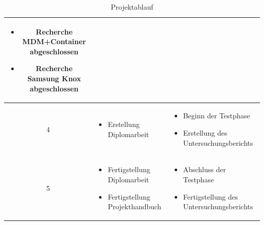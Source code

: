 \begin{table}
\begin{tabular}{| c | p{6cm} | p{7cm} |}
\begin{itemize}
\begin{itemize}
				\item Recherche MDM+Container abgeschlossen
				\item Recherche Samsung Knox abgeschlossen
			\end{itemize}
		\end{itemize}
		\\\hline %
		4
		&%
		\begin{itemize}
			\item Erstellung Diplomarbeit
		\end{itemize}
		&%
		\begin{itemize}
			\item Beginn der Testphase
			\item Erstellung des Untersuchungsberichts
		\end{itemize}
		\\\hline %
		5
		&%
		\begin{itemize}
			\item Fertigstellung Diplomarbeit
			\item Fertigstellung Projekthandbuch
		\end{itemize}
		&%
		\begin{itemize}
			\item Abschluss der Testphase
			\item Fertigstellung des Untersuchungsberichts
		\end{itemize}
		\\\hline %
	\end{tabular}
	\caption{Projektablauf}
\end{table}





	